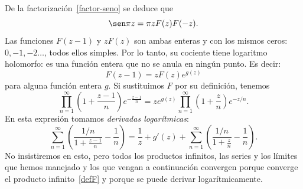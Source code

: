 \documentclass[11pt]{book}
\theoremstyle{plain} %
\theoremstyle{definition} %
\begin{document}
De la factorización~\eqref{factor-seno}
se deduce que
\[
   \sen \pi z = \pi z F(z) F(-z).
\]
Las funciones $F(z-1)$ y $z F(z)$ son ambas enteras y con los mismos ceros: $0, 
-1, -2 \dots$, todos ellos simples. Por lo tanto, su cociente tiene logaritmo 
holomorfo: es una función entera que no se anula en ningún punto. Es decir:
\begin{equation}
\label{Fzz-1}
   F(z-1) = z F(z) e^{g(z)}
\end{equation}
para alguna función entera $g$. Si sustituimos $F$ por su definición, tenemos
\[
   \prod_{n=1}^\infty \left(1 + \frac{z-1}{n}\right) e^{-\frac{z-1}{n}}
   = z e^{g(z)} \prod_{n=1}^\infty \left(1 + \frac{z}{n}\right) e^{-z/n}.
\]
En esta expresión tomamos \emph{derivadas logarítmicas}:
\[
   \sum_{n=1}^\infty \left( \frac{1/n}{1 + \frac{z-1}{n}} - \frac{1}{n} \right)
   = \frac{1}{z} + g'(z)
   + \sum_{n=1}^\infty \left( \frac{1/n}{1 + \frac{z}{n}} - \frac{1}{n} \right).
\]
No insistiremos en esto, pero todos los productos infinitos, las series y los 
límites que hemos manejado y los que vengan a continuación convergen porque 
converge el producto infinito~\eqref{defF} y porque se puede derivar 
logarítmicamente.
\end{document}
